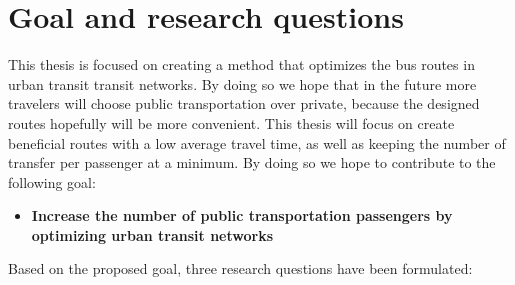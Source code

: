 \section{Goal and research questions}
\label{sec:goalAndResearchQuestions}
This thesis is focused on creating a method that optimizes the bus routes in urban transit transit networks. By doing so we hope that in the future more travelers will choose public transportation over private, because the designed routes hopefully will be more convenient. This thesis will focus on create beneficial routes with a low average travel time, as well as keeping the number of transfer per passenger at a minimum. By doing so we hope to contribute to the following goal: 

\begin{itemize}
\item \label{itm:goal} \textbf{Increase the number of public transportation passengers by optimizing urban transit networks}
\end{itemize}

Based on the proposed goal, three research questions have been formulated: 


